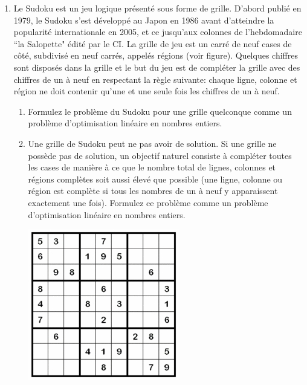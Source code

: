 \begin{enumerate}
    \begin{solution}
      \nosolution
    \end{solution}

  \item Le Sudoku est un jeu logique présenté sous forme de grille. D'abord publié en 1979, le Sudoku s'est développé au Japon en 1986 avant d'atteindre la popularité internationale en 2005, et ce jusqu'aux colonnes de l'hebdomadaire ``la Salopette" édité par le CI. La grille de jeu est un carré de neuf cases de côté, subdivisé en neuf carrés, appelés régions (voir figure). Quelques chiffres sont disposés dans la grille et le but du jeu est de compléter la grille avec des chiffres  de un à neuf en respectant la règle suivante: chaque ligne, colonne et région ne doit contenir qu'une et une seule fois  les chiffres de un à neuf.

    \begin{enumerate}

      \item Formulez le problème du Sudoku pour une grille quelconque comme un problème  d'optimisation linéaire en nombres entiers.

      \item Une grille de Sudoku peut ne pas avoir de solution. Si une grille ne possède pas de solution, un objectif naturel consiste à compléter  toutes les cases de manière à ce que le nombre total de lignes, colonnes et régions complètes soit aussi élevé que possible (une ligne, colonne ou région est complète si tous les nombres de un à neuf y apparaissent exactement une fois). Formulez ce problème comme un problème d'optimisation linéaire en nombres entiers.

        \begin{center}
          \includegraphics[scale=0.7]{sudo.jpg}
        \end{center}


\end{enumerate}
\end{enumerate}
